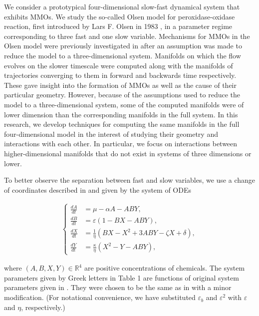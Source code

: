 \documentclass{ws-ijbc}
\begin{document}
We consider a prototypical four-dimensional slow-fast dynamical system that exhibits MMOs.  We study the so-called Olsen model for peroxidase-oxidase reaction, first introduced by Lars F. Olsen in 1983  \cite{Olsen}, in a parameter regime corresponding to three fast and one slow variable.  Mechanisms for MMOs in the Olsen model were previously investigated in \cite{QSSA} after an assumption was made to reduce the model to a three-dimensional system.  Manifolds on which the flow evolves on the slower timescale were computed along with the manifolds of trajectories converging to them in forward and backwards time respectively.  These gave insight into the formation of MMOs as well as the cause of their particular geometry.  However, because of the assumptions used to reduce the model to a three-dimensional system, some of the computed manifolds were of lower dimension than the corresponding manifolds in the full system.  In this research, we develop techniques for computing the same manifolds in the full four-dimensional model in the interest of studying their geometry and interactions with each other.  In particular, we focus on interactions between higher-dimensional manifolds that do not exist in systems of three dimensions or lower.


To better observe the separation between fast and slow variables, we use a change of coordinates described in \cite{Rescaling} and given by the system of ODEs
    
\begin{equation}
\begin{aligned}
\begin{cases}
\frac{dA}{dt} &= \mu - \alpha A - ABY, \\
\frac{dB}{dt} &= \varepsilon(1-BX - ABY), \\
\frac{dX}{dt} &= \frac{1}{\eta}(BX - X^2 +3ABY - \zeta X + \delta), \\
\frac{dY}{dt} &= \frac{\kappa}{\eta}(X^2 - Y - ABY),
\end{cases}
\end{aligned}
\label{equation_1}
\end{equation}
    
\noindent
where $(A, B, X, Y)\in\mathbb{R}^{4}$ are positive concentrations of chemicals.  The system parameters given by Greek letters in Table 1 are functions of original system parameters given in \cite{Olsen}. They were chosen to be the same as in \cite{Rescaling} with a minor modification.  (For notational convenience, we have substituted  $\varepsilon_{b}$ and $\varepsilon^{2}$ with $\varepsilon$ and $\eta$, respectively.)
\end{document}
